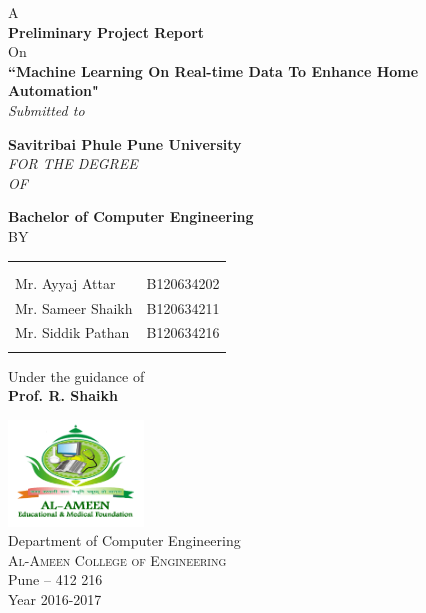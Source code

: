 \begin{titlepage}

\begin{center}

\textup{\small A\\{\bf Preliminary Project Report}\\On}\\[0.2in]

\Large \textbf {``Machine Learning On Real-time Data To Enhance Home Automation"}\\[0.25in]

       \small \emph{Submitted to}
        \vspace{.1in}

       {\bf Savitribai Phule Pune University}\\[0.1in]
        
       \small \emph{FOR THE DEGREE\\
        OF}
        \vspace{.1in}

       {\bf Bachelor of Computer Engineering}\\[0.25in]

\normalsize BY \\
\begin{table}[h]
\centering
\begin{tabular}{ll} \\
\\
\\
Mr. Ayyaj Attar & B120634202\\
Mr. Sameer Shaikh & B120634211\\ 
Mr. Siddik Pathan & B120634216\\ \\
\end{tabular}
\end{table}

\vspace{.1in}
Under the guidance of\\
{\textbf{Prof. R. Shaikh}}\\[0.2in]

\vfill

\includegraphics[width=0.27\textwidth]{./InitialPages/al_ameen-logo}\\[0.1in]
\Large{Department of Computer Engineering}\\
\normalsize
\textsc{Al-Ameen College of Engineering}\\
Pune -- 412 216 \\
\vspace{0.2cm}
Year 2016-2017

\end{center}

\end{titlepage}
